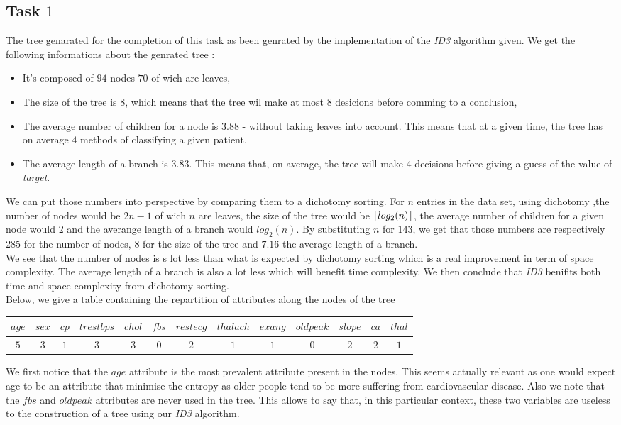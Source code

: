 \documentclass[french]{article}
\DeclarePairedDelimiter\ceil{\lceil}{\rceil}
\begin{document}
\subsection{Task $1$}
	The tree genarated for the completion of this task as been genrated by the implementation of the \emph{ID3} algorithm given. We get the following informations about the genrated tree :
	\begin{itemize}
		\item It's composed of $94$ nodes $70$ of wich are leaves,
		\item The size of the tree is 8, which means that the tree wil make at most $8$ desicions before comming to a conclusion,
		\item The average number of children for a node is $3.88$ - without taking leaves into account. This means that at a given time, the tree has on average $4$ methods of classifying a given patient,
		\item The average length of a branch is $3.83$.  This means that, on average, the tree will make $4$ decisions before giving a guess of the value of \emph{target}.
	\end{itemize}
	We can put those numbers into perspective by comparing them to a dichotomy sorting. For $n$ entries in the data set, using dichotomy ,the number of nodes would be $2n-1$ of wich $n$ are leaves, the size of the tree would be $\ceil*{log_2(n)}$, the average number of children for a given node would $2$ and the averange length of a branch would $log_2(n)$. By substituting $n$ for $143$, we get that those numbers are respectively $285$ for the number of nodes, $8$ for the size of the tree and $7.16$ the average length of a branch.\\
	We see that the number of nodes is s lot less than what is expected by dichotomy sorting which is a real improvement in term of space complexity. The average length of a branch is also a lot less which will benefit time complexity. We then conclude that \emph{ID3} benifits both time and space complexity from dichotomy sorting.\\
	Below, we give a table containing the repartition of attributes along the nodes of the tree
	\begin{center}
		\begin{tabular}{ |c|c|c|c|c|c|c|c|c|c|c|c|c| }
			\hline
			$age$ & $sex$ & $cp$ & $trestbps$ & $chol$ & $fbs$ & $restecg$ & $thalach$ & $exang$ & $oldpeak$ & $slope$ & $ca$ & $thal$\\
			\hline
			$5$ & $3$ & $1$ & $3$ & $3$ & $0$ & $2$ & $1$ & $1$ & $0$ & $2$  & $2$ & $1$\\
			\hline
		\end{tabular}
	\end{center}
	We first notice that the $age$ attribute is the most prevalent attribute present in the nodes. This seems actually relevant as one would expect age to be an attribute that minimise the entropy as older people tend to be more suffering from cardiovascular disease. Also we note that the $fbs$ and $oldpeak$ attributes are never used in the tree. This allows to say that, in this particular context, these two variables are useless to the construction of a tree using our \emph{ID3} algorithm.
		
\end{document}
